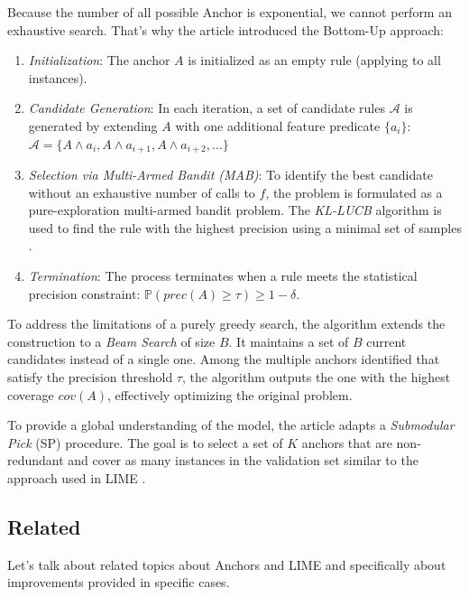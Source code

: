 Because the number of all possible Anchor is exponential, we cannot perform an 
exhaustive search. That's why the article introduced the Bottom-Up approach:
\begin{enumerate}
    \item \emph{Initialization}: The anchor $A$ is initialized as an empty rule (applying to all instances).
    \item \emph{Candidate Generation}: In each iteration, a set of candidate rules $\mathcal{A}$ is generated by extending $A$ with one additional feature predicate $\{a_i\}$: $\mathcal{A} = \{A \wedge a_i, A \wedge a_{i+1}, A \wedge a_{i+2}, ...\}$
    \item \emph{Selection via Multi-Armed Bandit (MAB)}: To identify the best 
    candidate without an exhaustive number of calls to $f$, the problem is 
    formulated as a pure-exploration multi-armed bandit problem. The \emph{KL-LUCB} 
    algorithm is used to find the rule with the highest precision using a minimal 
    set of samples \cite{ribeiro_anchors_2018}.
    \item \emph{Termination}: The process terminates when a rule meets the statistical precision constraint: $\mathbb{P} (prec(A) \geqslant \tau) \geqslant 1 - \delta$.
\end{enumerate}
To address the limitations of a purely greedy search, the algorithm extends the 
construction to a \emph{Beam Search} of size $B$.
It maintains a set of $B$ current candidates instead of a single one.
Among the multiple anchors identified that satisfy the precision threshold $\tau$, 
the algorithm outputs the one with the highest coverage $cov(A)$, effectively optimizing the original problem.

To provide a global understanding of the model, the article adapts a \emph{Submodular Pick} (SP) procedure. 
The goal is to select a set of $K$ anchors that are non-redundant and cover as 
many instances in the validation set similar to the approach used in LIME \cite{ribeiro_anchors_2018,ribeiro_why_2016}.

\subsection{Related}

Let's talk about related topics about Anchors and LIME and specifically about 
improvements provided in specific cases. 

